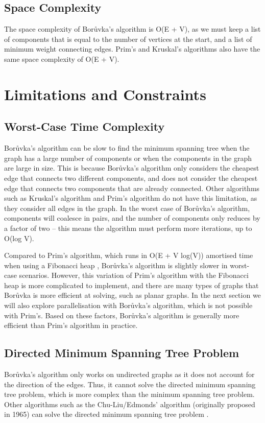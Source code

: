 \documentclass[a4paper, 11pt]{article}
\begin{document}
\subsection{Space Complexity}
The space complexity of Borůvka's algorithm is O(E + V), as we must keep a list of components that is equal to the number of vertices at the start, and a list of minimum weight connecting edges. Prim's and Kruskal's algorithms also have the same space complexity of O(E + V).

\section{Limitations and Constraints}

\subsection{Worst-Case Time Complexity}
Borůvka's algorithm can be slow to find the minimum spanning tree when the graph has a large number of components or when the components in the graph are large in size. This is because Borůvka's algorithm only considers the cheapest edge that connects two different components, and does not consider the cheapest edge that connects two components that are already connected. Other algorithms such as Kruskal's algorithm and Prim's algorithm do not have this limitation, as they consider all edges in the graph. In the worst case of Borůvka's algorithm, components will coalesce in pairs, and the number of components only reduces by a factor of two -- this means the algorithm must perform more iterations, up to O(log V). 

Compared to Prim's algorithm, which runs in O(E + V log(V)) amortised time when using a Fibonacci heap \cite{fredman1987fibonacci}, Borůvka's algorithm is slightly slower in worst-case scenarios. However, this variation of Prim's algorithm with the Fibonacci heap is more complicated to implement, and there are many types of graphs that Borůvka is more efficient at solving, such as planar graphs. In the next section we will also explore parallelisation with Borůvka's algorithm, which is not possible with Prim's. Based on these factors, Borůvka's algorithm is generally more efficient than Prim's algorithm in practice.

\subsection{Directed Minimum Spanning Tree Problem}
Borůvka's algorithm only works on undirected graphs as it does not account for the direction of the edges. Thus, it cannot solve the directed minimum spanning tree problem, which is more complex than the minimum spanning tree problem. Other algorithms such as the Chu-Liu/Edmonds' algorithm (originally proposed in 1965) can solve the directed minimum spanning tree problem \cite{gabow1986efficient}.
\end{document}
